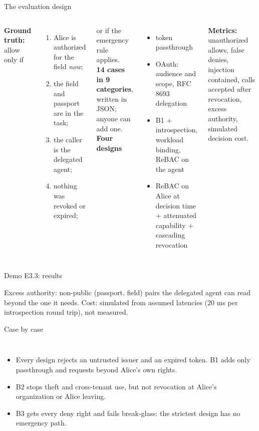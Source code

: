 \documentclass[aspectratio=169, 10pt]{beamer}
\begin{document}
\begin{frame}{The evaluation design}
  \begin{columns}[T]
    \small\textbf{Ground truth:} allow only if
    \begin{enumerate}\scriptsize
      \item Alice is authorized for the field \emph{now};
      \item the field and passport are in the task;
      \item the caller is the delegated agent;
      \item nothing was revoked or expired;
    \end{enumerate}
    \small or if the emergency rule applies.\\[3pt]
    \small\textbf{14 cases in 9 categories}, written in JSON; anyone can add one.
    \small\textbf{Four designs}
    \begin{itemize}\scriptsize
      \item[B0] token passthrough
      \item[B1] OAuth: audience and scope, RFC 8693 delegation
      \item[B2] B1 + introspection, workload binding, ReBAC on the agent
      \item[B3] ReBAC on Alice at decision time + attenuated capability + cascading revocation
    \end{itemize}
    \small\textbf{Metrics:} unauthorized allows, false denies, injection contained, calls accepted after revocation, excess authority, simulated decision cost.
  \end{columns}
\end{frame}

\begin{frame}{Demo E3.3: results}
  \centering{}\par
  \vspace{2mm}
  {\scriptsize Excess authority: non-public (passport, field) pairs the delegated agent can read beyond the one it needs. Cost: simulated from assumed latencies (20 ms per introspection round trip), not measured.}
\end{frame}

\begin{frame}{Case by case}
  \begin{columns}[T]
    \small
    \begin{itemize}
      \item Every design rejects an untrusted issuer and an expired token. B1 adds only passthrough and requests beyond Alice's own rights.
      \item B2 stops theft and cross-tenant use, but not revocation at Alice's organization or Alice leaving.
      \item B3 gets every deny right and \alert{fails break-glass}: the strictest design has no emergency path.
    \end{itemize}
  \end{columns}
\end{frame}
\end{document}
